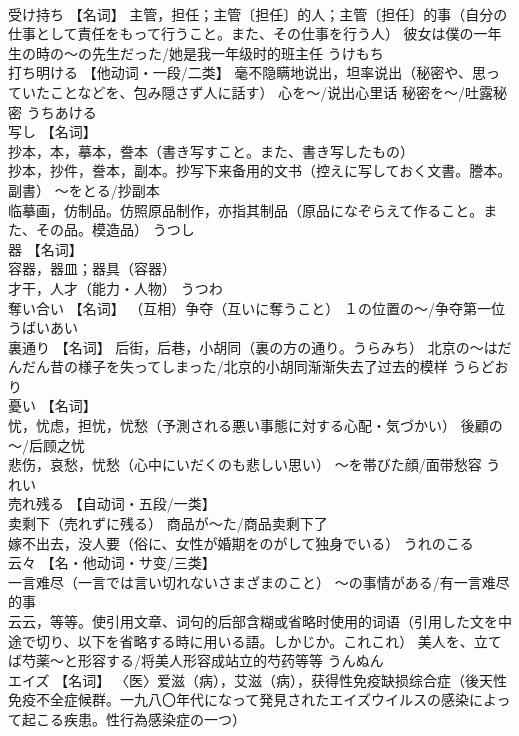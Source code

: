 \documentclass[8pt]{extreport}
\begin{document}
\begin{CJK}{UTF8}{min}
\\	受け持ち	【名词】 主管，担任；主管〔担任〕的人；主管〔担任〕的事（自分の仕事として責任をもって行うこと。また、その仕事を行う人） 彼女は僕の一年生の時の～の先生だった/她是我一年级时的班主任	うけもち	
\\	打ち明ける	【他动词・一段/二类】 毫不隐瞒地说出，坦率说出（秘密や、思っていたことなどを、包み隠さず人に話す） 心を～/说出心里话 秘密を～/吐露秘密	うちあける	
\\	写し	【名词】 
\\	抄本，本，摹本，誊本（書き写すこと。また、書き写したもの） 
\\	抄本，抄件，誊本，副本。抄写下来备用的文书（控えに写しておく文書。謄本。副書） ～をとる/抄副本 
\\	临摹画，仿制品。仿照原品制作，亦指其制品（原品になぞらえて作ること。また、その品。模造品）	うつし	
\\	器	【名词】 
\\	容器，器皿；器具（容器） 
\\	才干，人才（能力・人物）	うつわ	
\\	奪い合い	【名词】 （互相）争夺（互いに奪うこと） １の位置の～/争夺第一位	うばいあい	
\\	裏通り	【名词】 后街，后巷，小胡同（裏の方の通り。うらみち） 北京の～はだんだん昔の様子を失ってしまった/北京的小胡同渐渐失去了过去的模样	うらどおり	
\\	憂い	【名词】 
\\	忧，忧虑，担忧，忧愁（予測される悪い事態に対する心配・気づかい） 後顧の～/后顾之忧 
\\	悲伤，哀愁，忧愁（心中にいだくのも悲しい思い） ～を帯びた顔/面带愁容	うれい	
\\	売れ残る	【自动词・五段/一类】 
\\	卖剩下（売れずに残る） 商品が～た/商品卖剩下了 
\\	嫁不出去，没人要（俗に、女性が婚期をのがして独身でいる）	うれのこる	
\\	云々	【名・他动词・サ变/三类】 
\\	一言难尽（一言では言い切れないさまざまのこと） ～の事情がある/有一言难尽的事 
\\	云云，等等。使引用文章、词句的后部含糊或省略时使用的词语（引用した文を中途で切り、以下を省略する時に用いる語。しかじか。これこれ） 美人を、立てば芍薬～と形容する/将美人形容成站立的芍药等等	うんぬん	
\\	エイズ	【名词】 〈医〉爱滋（病），艾滋（病），获得性免疫缺损综合症（後天性免疫不全症候群。一九八〇年代になって発見されたエイズウイルスの感染によって起こる疾患。性行為感染症の一つ）		

\end{CJK}
\end{document}
